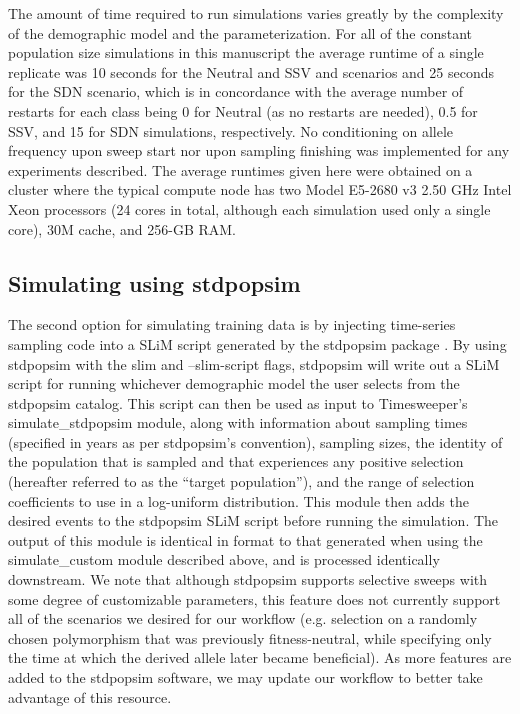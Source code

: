 The amount of time required to run simulations varies greatly by the complexity of the demographic model and the parameterization. For all of the constant population size simulations in this manuscript the average runtime of a single replicate was 10 seconds for the Neutral and SSV and scenarios and 25 seconds for the SDN scenario, which is in concordance with the average number of restarts for each class being 0 for Neutral (as no restarts are needed), 0.5 for SSV, and 15 for SDN simulations, respectively. No conditioning on allele frequency upon sweep start nor upon sampling finishing was implemented for any experiments described. The average runtimes given here were obtained on a cluster where the typical compute node has two Model E5-2680 v3 2.50 GHz Intel Xeon processors (24 cores in total, although each simulation used only a single core), 30M cache, and 256-GB RAM. \\

\subsection{Simulating using stdpopsim}

The second option for simulating training data is by injecting time-series sampling code into a SLiM script generated by the stdpopsim package \cite{adrionCommunitymaintainedStandardLibrary2020}. By using stdpopsim with the slim and --slim-script flags, stdpopsim will write out a SLiM script for running whichever demographic model the user selects from the stdpopsim catalog. This script can then be used as input to Timesweeper’s simulate\_stdpopsim module, along with information about sampling times (specified in years as per stdpopsim’s convention), sampling sizes, the identity of the population that is sampled and that experiences any positive selection (hereafter referred to as the “target population”), and the range of selection coefficients to use in a log-uniform distribution. This module then adds the desired events to the stdpopsim SLiM script before running the simulation. The output of this module is identical in format to that generated when using the simulate\_custom module described above, and is processed identically downstream. We note that although stdpopsim supports selective sweeps with some degree of customizable parameters, this feature does not currently support all of the scenarios we desired for our workflow (e.g. selection on a randomly chosen polymorphism that was previously fitness-neutral, while specifying only the time at which the derived allele later became beneficial). As more features are added to the stdpopsim software, we may update our workflow to better take advantage of this resource. \\

